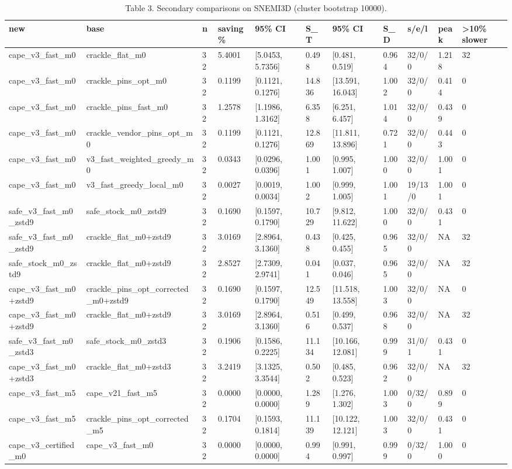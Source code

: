 \begin{table}[t]
\centering
\small
\caption{Table 3. Secondary comparisons on SNEMI3D (cluster bootstrap 10000).}
\begin{tabular}{lllllllllll}
\hline
new & base & n & saving \% & 95\% CI & S\_T & 95\% CI & S\_D & s/e/l & peak & >10\% slower \\
\hline
cape\_v3\_fast\_m0 & crackle\_flat\_m0 & 32 & 5.4001 & [5.0453, 5.7356] & 0.498 & [0.481, 0.519] & 0.964 & 32/0/0 & 1.218 & 32 \\
cape\_v3\_fast\_m0 & crackle\_pins\_opt\_m0 & 32 & 0.1199 & [0.1121, 0.1276] & 14.836 & [13.591, 16.043] & 1.002 & 32/0/0 & 0.414 & 0 \\
cape\_v3\_fast\_m0 & crackle\_pins\_fast\_m0 & 32 & 1.2578 & [1.1986, 1.3162] & 6.358 & [6.251, 6.457] & 1.014 & 32/0/0 & 0.439 & 0 \\
cape\_v3\_fast\_m0 & crackle\_vendor\_pins\_opt\_m0 & 32 & 0.1199 & [0.1121, 0.1276] & 12.869 & [11.811, 13.896] & 0.721 & 32/0/0 & 0.443 & 0 \\
cape\_v3\_fast\_m0 & v3\_fast\_weighted\_greedy\_m0 & 32 & 0.0343 & [0.0296, 0.0396] & 1.001 & [0.995, 1.007] & 1.000 & 32/0/0 & 1.001 & 0 \\
cape\_v3\_fast\_m0 & v3\_fast\_greedy\_local\_m0 & 32 & 0.0027 & [0.0019, 0.0034] & 1.002 & [0.999, 1.005] & 1.001 & 19/13/0 & 1.001 & 0 \\
safe\_v3\_fast\_m0\_zstd9 & safe\_stock\_m0\_zstd9 & 32 & 0.1690 & [0.1597, 0.1790] & 10.729 & [9.812, 11.622] & 1.000 & 32/0/0 & 0.431 & 0 \\
safe\_v3\_fast\_m0\_zstd9 & crackle\_flat\_m0+zstd9 & 32 & 3.0169 & [2.8964, 3.1360] & 0.438 & [0.425, 0.455] & 0.965 & 32/0/0 & NA & 32 \\
safe\_stock\_m0\_zstd9 & crackle\_flat\_m0+zstd9 & 32 & 2.8527 & [2.7309, 2.9741] & 0.041 & [0.037, 0.046] & 0.965 & 32/0/0 & NA & 32 \\
cape\_v3\_fast\_m0+zstd9 & crackle\_pins\_opt\_corrected\_m0+zstd9 & 32 & 0.1690 & [0.1597, 0.1790] & 12.549 & [11.518, 13.558] & 1.003 & 32/0/0 & NA & 0 \\
cape\_v3\_fast\_m0+zstd9 & crackle\_flat\_m0+zstd9 & 32 & 3.0169 & [2.8964, 3.1360] & 0.516 & [0.499, 0.537] & 0.968 & 32/0/0 & NA & 32 \\
safe\_v3\_fast\_m0\_zstd3 & safe\_stock\_m0\_zstd3 & 32 & 0.1906 & [0.1586, 0.2225] & 11.134 & [10.166, 12.081] & 0.999 & 31/0/1 & 0.431 & 0 \\
cape\_v3\_fast\_m0+zstd3 & crackle\_flat\_m0+zstd3 & 32 & 3.2419 & [3.1325, 3.3544] & 0.502 & [0.485, 0.523] & 0.962 & 32/0/0 & NA & 32 \\
cape\_v3\_fast\_m5 & cape\_v21\_fast\_m5 & 32 & 0.0000 & [0.0000, 0.0000] & 1.289 & [1.276, 1.302] & 1.003 & 0/32/0 & 0.899 & 0 \\
cape\_v3\_fast\_m5 & crackle\_pins\_opt\_corrected\_m5 & 32 & 0.1704 & [0.1593, 0.1814] & 11.139 & [10.122, 12.121] & 1.003 & 32/0/0 & 0.431 & 0 \\
cape\_v3\_certified\_m0 & cape\_v3\_fast\_m0 & 32 & 0.0000 & [0.0000, 0.0000] & 0.994 & [0.991, 0.997] & 0.999 & 0/32/0 & 1.000 & 0 \\
\hline
\end{tabular}
\end{table}
